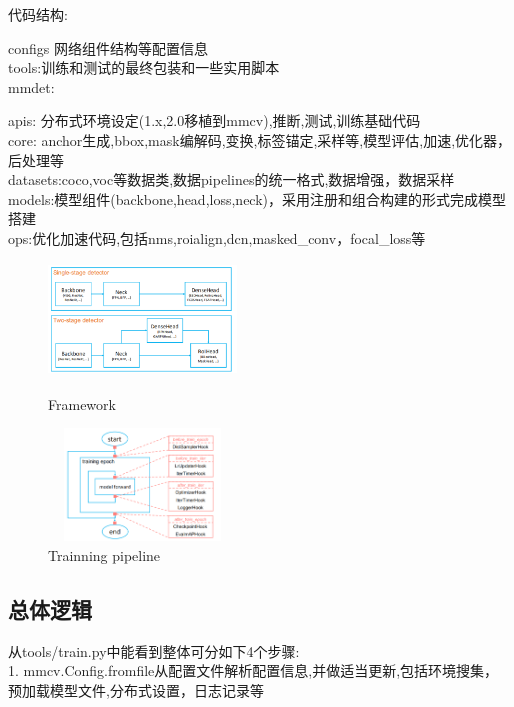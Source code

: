 \documentclass[UTF8]{ctexart}
\begin{document}
 \noindent 代码结构:
\begin{adjustwidth}{0.5cm}{0cm}
 configs 网络组件结构等配置信息\\
 tools:训练和测试的最终包装和一些实用脚本\\
 mmdet:
\begin{adjustwidth}{0.5cm}{0cm}
 	apis: 分布式环境设定(1.x,2.0移植到mmcv),推断,测试,训练基础代码\\
 	core: anchor生成,bbox,mask编解码,变换,标签锚定,采样等,模型评估,加速,优化器，后处理等\\
 	datasets:coco,voc等数据类,数据pipelines的统一格式,数据增强，数据采样\\
 	models:模型组件(backbone,head,loss,neck)，采用注册和组合构建的形式完成模型搭建\\
	ops:优化加速代码,包括nms,roialign,dcn,masked\_conv，focal\_loss等\\
 \end{adjustwidth}
 \end{adjustwidth}

\begin{figure}[htbp]
 	\centering
	\begin{minipage}[t]{0.48\textwidth}
 	\centering
 	\includegraphics[width=5cm, height=3cm]{./pic/mmdetect.png}
 	\caption{ Framework }
 	\end{minipage}
 	\begin{minipage}[t]{0.48\textwidth}
 	\centering
	\includegraphics[width=5cm,height=3cm]{./pic/mmdetect_pipe.png}
	\caption{Trainning pipeline}
	\label{trainpipe_pic}
 	\end{minipage}
 \end{figure}

 \subsection{总体逻辑}
从tools/train.py中能看到整体可分如下4个步骤:\\
1. mmcv.Config.fromfile从配置文件解析配置信息,并做适当更新,包括环境搜集，预加载模型文件,分布式设置，日志记录等
 
\end{document}
